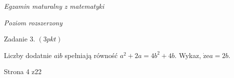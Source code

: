 \documentclass[a4paper,12pt]{article}
\begin{document}
{\it Egzamin maturalny z matematyki}

{\it Poziom rozszerzony}

Zadanie 3. $(3pkt)$

Liczby dodatnie $a\mathrm{i}b$ spełniają równość $a^{2}+2a=4b^{2}+4b$. Wykaz, $\dot{\mathrm{z}}\mathrm{e}a=2b.$

Strona 4 z22
\end{document}
